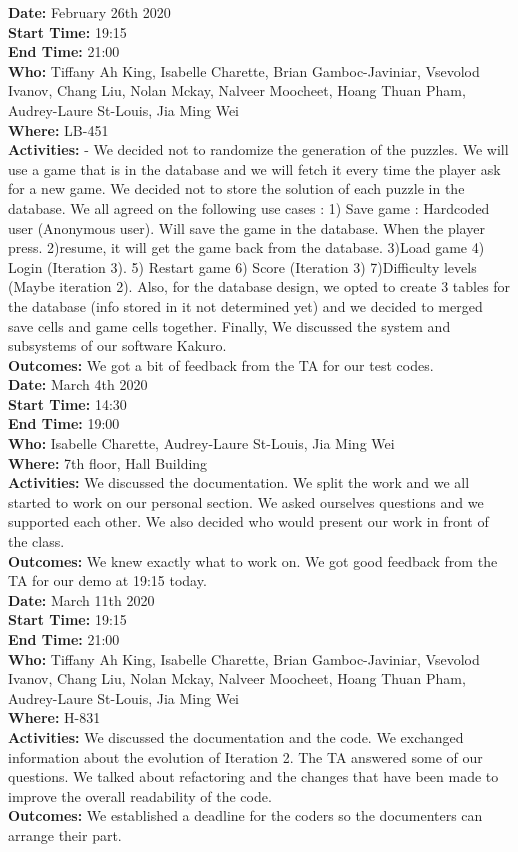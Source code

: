 \documentclass[12pt]{article}
\begin{document}
{\bf Date:} February 26th 2020 \\
{\bf Start Time:} 19:15 \\
{\bf End Time:} 21:00 \\
{\bf Who:} Tiffany Ah King, Isabelle Charette, Brian Gamboc-Javiniar, Vsevolod Ivanov, Chang Liu, Nolan Mckay, Nalveer Moocheet, Hoang Thuan Pham, Audrey-Laure St-Louis, Jia Ming Wei \\
{\bf Where:} LB-451 \\
{\bf Activities:} - We decided not to randomize the generation of the puzzles. We will use a game that is in the database and we will fetch it every time the player ask for a new game. We decided not to store the solution of each puzzle in the database.
We all agreed on the following use cases : 1) Save game : Hardcoded user (Anonymous user). Will save the game in the database. When the player press. 2)resume, it will get the game back from the database. 3)Load game 4) Login (Iteration 3). 5) Restart game 6) Score (Iteration 3) 7)Difficulty levels (Maybe iteration 2). Also, for the database design, we opted to create 3 tables for the database (info stored in it not determined yet) and we decided to merged save cells and game cells together. Finally, We discussed the system and subsystems of our software Kakuro.\\
{\bf Outcomes:} We got a bit of feedback from the TA for our test codes.\\

{\bf Date:} March 4th 2020 \\
{\bf Start Time:} 14:30 \\
{\bf End Time:} 19:00 \\
{\bf Who:} Isabelle Charette, Audrey-Laure St-Louis, Jia Ming Wei \\
{\bf Where:} 7th floor, Hall Building \\
{\bf Activities:} We discussed the documentation. We split the work and we all started to work on our personal section. We asked ourselves questions and we supported each other. We also decided who would present our work in front of the class.\\
{\bf Outcomes:} We knew exactly what to work on. We got good feedback from the TA for our demo at 19:15 today.\\

{\bf Date:} March 11th 2020 \\
{\bf Start Time:} 19:15 \\
{\bf End Time:} 21:00 \\
{\bf Who:} Tiffany Ah King, Isabelle Charette, Brian Gamboc-Javiniar, Vsevolod Ivanov, Chang Liu, Nolan Mckay, Nalveer Moocheet, Hoang Thuan Pham, Audrey-Laure St-Louis, Jia Ming Wei \\
{\bf Where:} H-831 \\
{\bf Activities:} We discussed the documentation and the code. We exchanged information about the evolution of Iteration 2. The TA answered some of our questions. We talked about refactoring and the changes that have been made to improve the overall readability of the code. \\
{\bf Outcomes:} We established a deadline for the coders so the documenters can arrange their part.  \\

\end{document}
